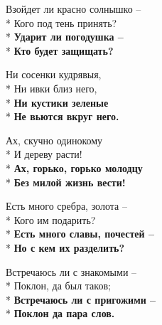 \medskip

\begin{minipage}{\linewidth}
Взойдет ли красно солнышко –\\*
Кого под тень принять?\\*
\textbf{Ударит ли погодушка –}\\*
\textbf{Кто будет защищать?}\\
\end{minipage}\par\medskip\nobreak

\medskip

\begin{minipage}{\linewidth}
Ни сосенки кудрявыя,\\*
Ни ивки близ него,\\*
\textbf{Ни кустики зеленые}\\*
\textbf{Не вьются вкруг него.}\\
\end{minipage}\par\medskip\nobreak

\medskip

\begin{minipage}{\linewidth}
Ах, скучно одинокому\\*
И дереву расти!\\*
\textbf{Ах, горько, горько молодцу}\\*
\textbf{Без милой жизнь вести!}\\
\end{minipage}\par\medskip\nobreak

\medskip

\begin{minipage}{\linewidth}
Есть много сребра, золота –\\*
Кого им подарить?\\*
\textbf{Есть много славы, почестей –}\\*
\textbf{Но с кем их разделить?}\\
\end{minipage}\par\medskip\nobreak

\medskip

\begin{minipage}{\linewidth}
Встречаюсь ли с знакомыми –\\*
Поклон, да был таков;\\*
\textbf{Встречаюсь ли с пригожими –}\\*
\textbf{Поклон да пара слов.}\\
\end{minipage}\par\medskip\nobreak

